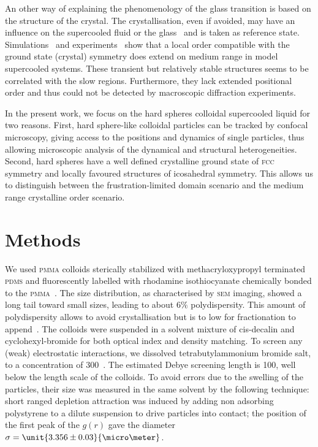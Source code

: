 \documentclass{revtex4-1}
\begin{document}
An other way of explaining the phenomenology of the glass transition is based on the structure of the crystal. The crystallisation, even if avoided, may have an influence on the supercooled fluid or the glass~\citep{tanaka1999top, Cavagna2003} and is taken as reference state. Simulations~\cite{kawasaki2007cbd, Kawasaki2010, Pedersen2010, Coslovich2011} and experiments~\citep{watanabe2008} show that a local order compatible with the ground state (crystal) symmetry does extend on medium range in model supercooled systems. These transient but relatively stable structures seems to be correlated with the slow regions. Furthermore, they lack extended positional order and thus could not be detected by macroscopic diffraction experiments.

In the present work, we focus on the hard spheres colloidal supercooled liquid for two reasons. First, hard sphere-like colloidal particles can be tracked by confocal microscopy, giving access to the positions and dynamics of single particles, thus allowing microscopic analysis of the dynamical and structural heterogeneities. Second, hard spheres have a well defined crystalline ground state of \textsc{fcc} symmetry and locally favoured structures of icosahedral symmetry. This allows us to distinguish between the frustration-limited domain scenario and the medium range crystalline order scenario.


\section*{Methods}

We used \textsc{pmma} colloids sterically stabilized with methacryloxypropyl terminated \textsc{pdms} and fluorescently labelled with rhodamine isothiocyanate chemically bonded to the \textsc{pmma}~\citep{bosma2002}. The size distribution, as characterised by \textsc{sem} imaging, showed a long tail toward small sizes, leading to about $6\%$ polydispersity. This amount of polydispersity allows to avoid crystallisation but is to low for fractionation to append~\citep{Fasolo2003}. The colloids were suspended in a solvent mixture of cis-decalin and cyclohexyl-bromide for both optical index and density matching. To screen any (weak) electrostatic interactions, we dissolved tetrabutylammonium bromide salt, to a concentration of \unit{300}{\nano\mole\per\liter}~\citep{royall2005}. The estimated Debye screening length is \unit{100}{\nano\metre}, well below the length scale of the colloids. To avoid errors due to the swelling of the particles, their size was measured in the same solvent by the following technique: short ranged depletion attraction was induced by adding non adsorbing polystyrene to a dilute suspension to drive particles into contact; the position of the first peak of the $g(r)$ gave the diameter $\sigma = \unit{3.356\pm0.03}{\micro\meter}$.
\end{document}
